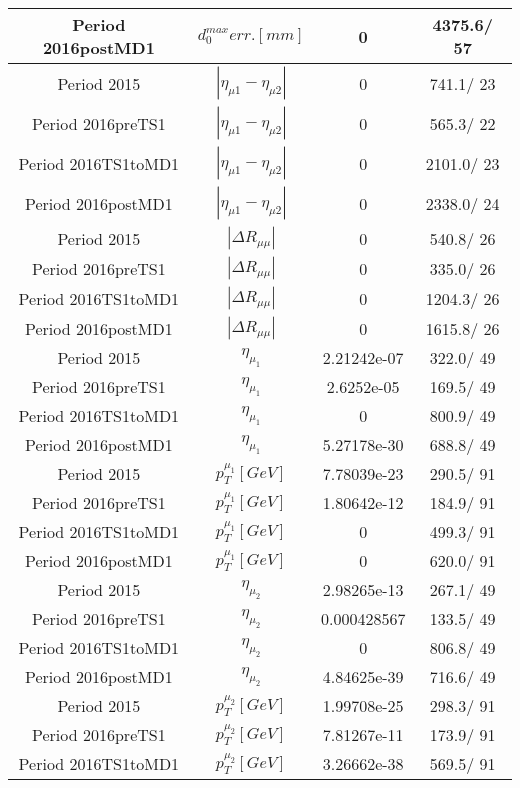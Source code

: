 \documentclass{article}
\begin{document}
\begin{longtable}{c|c|c|c}
\hline
 Period 2016postMD1 & $d_{0}^{max} err. [mm]$ & 0 & 4375.6/ 57\\
\hline
 Period 2015 & $|\eta_{\mu1}-\eta_{\mu2}|$ & 0 & 741.1/ 23\\
\hline
 Period 2016preTS1 & $|\eta_{\mu1}-\eta_{\mu2}|$ & 0 & 565.3/ 22\\
\hline
 Period 2016TS1toMD1 & $|\eta_{\mu1}-\eta_{\mu2}|$ & 0 & 2101.0/ 23\\
\hline
 Period 2016postMD1 & $|\eta_{\mu1}-\eta_{\mu2}|$ & 0 & 2338.0/ 24\\
\hline
 Period 2015 & $|\Delta R_{\mu \mu}|$ & 0 & 540.8/ 26\\
\hline
 Period 2016preTS1 & $|\Delta R_{\mu \mu}|$ & 0 & 335.0/ 26\\
\hline
 Period 2016TS1toMD1 & $|\Delta R_{\mu \mu}|$ & 0 & 1204.3/ 26\\
\hline
 Period 2016postMD1 & $|\Delta R_{\mu \mu}|$ & 0 & 1615.8/ 26\\
\hline
 Period 2015 & $\eta_{\mu_{1}}$ & 2.21242e-07 & 322.0/ 49\\
\hline
 Period 2016preTS1 & $\eta_{\mu_{1}}$ & 2.6252e-05 & 169.5/ 49\\
\hline
 Period 2016TS1toMD1 & $\eta_{\mu_{1}}$ & 0 & 800.9/ 49\\
\hline
 Period 2016postMD1 & $\eta_{\mu_{1}}$ & 5.27178e-30 & 688.8/ 49\\
\hline
 Period 2015 & $p_{T}^{\mu_{1}} [GeV]$ & 7.78039e-23 & 290.5/ 91\\
\hline
 Period 2016preTS1 & $p_{T}^{\mu_{1}} [GeV]$ & 1.80642e-12 & 184.9/ 91\\
\hline
 Period 2016TS1toMD1 & $p_{T}^{\mu_{1}} [GeV]$ & 0 & 499.3/ 91\\
\hline
 Period 2016postMD1 & $p_{T}^{\mu_{1}} [GeV]$ & 0 & 620.0/ 91\\
\hline
 Period 2015 & $\eta_{\mu_{2}}$ & 2.98265e-13 & 267.1/ 49\\
\hline
 Period 2016preTS1 & $\eta_{\mu_{2}}$ & 0.000428567 & 133.5/ 49\\
\hline
 Period 2016TS1toMD1 & $\eta_{\mu_{2}}$ & 0 & 806.8/ 49\\
\hline
 Period 2016postMD1 & $\eta_{\mu_{2}}$ & 4.84625e-39 & 716.6/ 49\\
\hline
 Period 2015 & $p_{T}^{\mu_{2}} [GeV]$ & 1.99708e-25 & 298.3/ 91\\
\hline
 Period 2016preTS1 & $p_{T}^{\mu_{2}} [GeV]$ & 7.81267e-11 & 173.9/ 91\\
\hline
 Period 2016TS1toMD1 & $p_{T}^{\mu_{2}} [GeV]$ & 3.26662e-38 & 569.5/ 91\\

\end{longtable}
\end{document}
